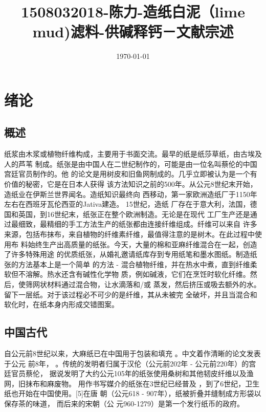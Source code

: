 \documentclass[11pt]{article}
\date{\today}
\title{1508032018-陈力-造纸白泥（lime mud)滤料-供碱释钙－文献宗述}
\begin{document}
\maketitle
\tableofcontents



\section{绪论}
\label{sec:orgdf47a05}

\subsection{概述}
\label{sec:org15b2c37}
纸浆由木浆或植物纤维构成，主要用于书面交流。最早的纸是纸莎草纸，由古埃及人的芦苇
制成。纸张是由中国人在二世纪制作的，可能是由一位名叫蔡伦的中国宫廷官员制作的。他
的论文是用树皮和旧鱼网制成的。几乎立即被认为是一个有价值的秘密，它是在日本人获得
该方法知识之前的500年。从公元8世纪末开始，造纸业在伊斯兰世界闻名。造纸知识最终向
西移动，第一家欧洲造纸厂于1150年左右在西班牙瓦伦西亚的Jativa建造。 15世纪，造纸
厂存在于意大利，法国，德国和英国，到16世纪末，纸张正在整个欧洲制造。无论是在现代
工厂生产还是通过最细致，最精细的手工方法生产的纸张都由连接纤维组成。纤维可以来自
许多来源，包括布抹布，来自植物的纤维素纤维，最值得注意的是树木。在此过程中使用布
料始终生产出高质量的纸张。今天，大量的棉和亚麻纤维混合在一起，创造了许多特殊用途
的优质纸张，从婚礼邀请纸库存到专用纸笔和墨水图纸。制造纸张的方法基本上是一个简单
的方法 - 混合植物纤维，并在热水中煮，直到纤维柔软但不溶解。热水还含有碱性化学物
质，例如碱液，它们在烹饪时软化纤维。然后，使筛网状材料通过混合物，让水滴落和/或
蒸发，然后挤压或吸去额外的水。留下一层纸。对于该过程必不可少的是纤维，其从未被完
全破坏，并且当混合和软化时，在纸本身内形成交错图案。


\subsection{中国古代}
\label{sec:org76d7326}
自公元前8世纪以来，大麻纸已在中国用于包装和填充
\cite{Needham_Joseph_1986_Science_and_Civilization_in_China} 。中文着作清晰的论文发表于公元
前8年，\cite{World_Archaeological_Congress_eNewsletter} 。传统的发明者归属于汉伦（公元前202年 - 公元前220年）的宫廷官员蔡伦，
据说发明了大约公元105年的纸张使用桑树和其他韧皮纤维以及渔网，旧抹布和麻废物。\cite{In_Encyclopædia_Britannica}
用作书写媒介的纸张在3世纪已经普及\cite{Science_and_Civilization_in_China} ，到了6世纪，卫生纸也开始在中国使用。[5]在唐
朝（公元618 - 907年），纸被折叠并缝制成方形袋以保存茶的味道，\cite{Needham_Joseph_1986_Science_and_Civilization_in_China} 而后来的宋朝（公
元960-1279）是第一个发行纸币的政府。
\end{document}
